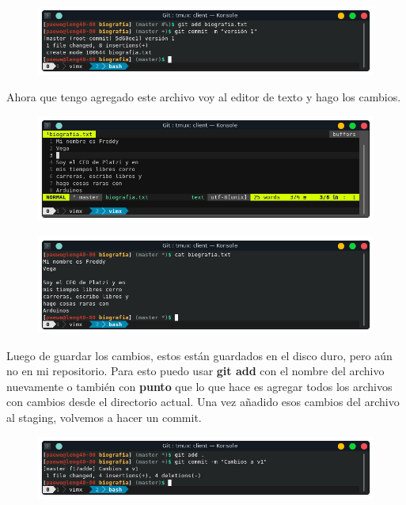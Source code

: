 \documentclass{article}
\begin{document}
\begin{figure}[h!]
  \centering
  \includegraphics[scale=0.75]{./Pictures/005_version1.png}
\end{figure}

Ahora que tengo agregado este archivo voy al editor de texto y hago los
cambios.

\begin{figure}[h!]
  \centering
  \includegraphics[scale=0.75]{./Pictures/006_editor.png}
\end{figure}

\begin{figure}[h!]
  \centering
  \includegraphics[scale=0.75]{./Pictures/006_cambios.png}
\end{figure}

Luego de guardar los cambios, estos están guardados en el disco duro, pero aún
no en mi repositorio. Para esto puedo usar \textbf{git add} con el nombre del
archivo nuevamente o también con \textbf{punto} que lo que hace es agregar
todos los archivos con cambios desde el directorio actual.
Una vez añadido esos cambios del archivo al staging, volvemos a hacer un commit.

\begin{figure}[h!]
  \centering
  \includegraphics[scale=0.75]{./Pictures/007_gitcommit.png}
\end{figure}
\end{document}
